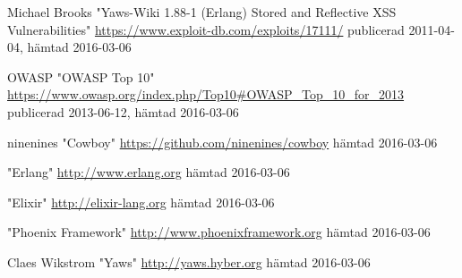 \documentclass[12pt]{article}
\begin{document}
\begin{thebibliography}{99}
 Michael Brooks "Yaws-Wiki 1.88-1 (Erlang) Stored and Reflective XSS Vulnerabilities"  \url{https://www.exploit-db.com/exploits/17111/}
publicerad 2011-04-04,
hämtad 2016-03-06

 OWASP "OWASP Top 10" \url{https://www.owasp.org/index.php/Top10#OWASP_Top_10_for_2013}
publicerad 2013-06-12,
hämtad 2016-03-06

ninenines "Cowboy" \url{https://github.com/ninenines/cowboy}
hämtad 2016-03-06

"Erlang" \url{http://www.erlang.org}
hämtad 2016-03-06

"Elixir" \url{http://elixir-lang.org}
hämtad 2016-03-06

  "Phoenix Framework" \url{http://www.phoenixframework.org}
hämtad 2016-03-06

 Claes Wikstrom "Yaws" \url{http://yaws.hyber.org}
hämtad 2016-03-06

\end{thebibliography}
\end{document}
